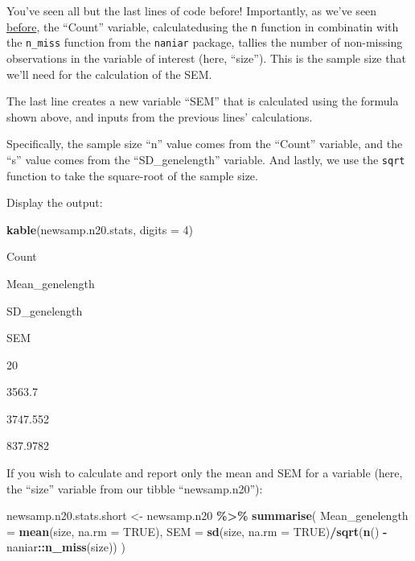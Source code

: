 \documentclass[
]{book}
\newenvironment{Shaded}{\begin{snugshade}}{\end{snugshade}}
\newcommand{\AttributeTok}[1]{\textcolor[rgb]{0.13,0.29,0.53}{#1}}
\newcommand{\ConstantTok}[1]{\textcolor[rgb]{0.56,0.35,0.01}{#1}}
\newcommand{\DecValTok}[1]{\textcolor[rgb]{0.00,0.00,0.81}{#1}}
\newcommand{\FunctionTok}[1]{\textcolor[rgb]{0.13,0.29,0.53}{\textbf{#1}}}
\newcommand{\NormalTok}[1]{#1}
\newcommand{\OtherTok}[1]{\textcolor[rgb]{0.56,0.35,0.01}{#1}}
\newcommand{\SpecialCharTok}[1]{\textcolor[rgb]{0.81,0.36,0.00}{\textbf{#1}}}
\begin{document}
You've seen all but the last lines of code before! Importantly, as we've seen \hyperref[mean_sd]{before}, the ``Count'' variable, calculatedusing the \texttt{n} function in combinatin with the \texttt{n\_miss} function from the \texttt{naniar} package, tallies the number of non-missing observations in the variable of interest (here, ``size''). This is the sample size that we'll need for the calculation of the SEM.

The last line creates a new variable ``SEM'' that is calculated using the formula shown above, and inputs from the previous lines' calculations.

Specifically, the sample size ``n'' value comes from the ``Count'' variable, and the ``s'' value comes from the ``SD\_genelength'' variable. And lastly, we use the \texttt{sqrt} function to take the square-root of the sample size.

Display the output:

\begin{Shaded}
\begin{Highlighting}[]
\FunctionTok{kable}\NormalTok{(newsamp.n20.stats, }\AttributeTok{digits =} \DecValTok{4}\NormalTok{)}
\end{Highlighting}
\end{Shaded}

Count

Mean\_genelength

SD\_genelength

SEM

20

3563.7

3747.552

837.9782

If you wish to calculate and report only the mean and SEM for a variable (here, the ``size'' variable from our tibble ``newsamp.n20''):

\begin{Shaded}
\begin{Highlighting}[]
\NormalTok{newsamp.n20.stats.short }\OtherTok{\textless{}{-}}\NormalTok{ newsamp.n20 }\SpecialCharTok{\%\textgreater{}\%}
  \FunctionTok{summarise}\NormalTok{(}
    \AttributeTok{Mean\_genelength =} \FunctionTok{mean}\NormalTok{(size, }\AttributeTok{na.rm =} \ConstantTok{TRUE}\NormalTok{),}
    \AttributeTok{SEM =} \FunctionTok{sd}\NormalTok{(size, }\AttributeTok{na.rm =} \ConstantTok{TRUE}\NormalTok{)}\SpecialCharTok{/}\FunctionTok{sqrt}\NormalTok{(}\FunctionTok{n}\NormalTok{() }\SpecialCharTok{{-}}\NormalTok{ naniar}\SpecialCharTok{::}\FunctionTok{n\_miss}\NormalTok{(size))}
\NormalTok{  )}
\end{Highlighting}
\end{Shaded}
\end{document}
